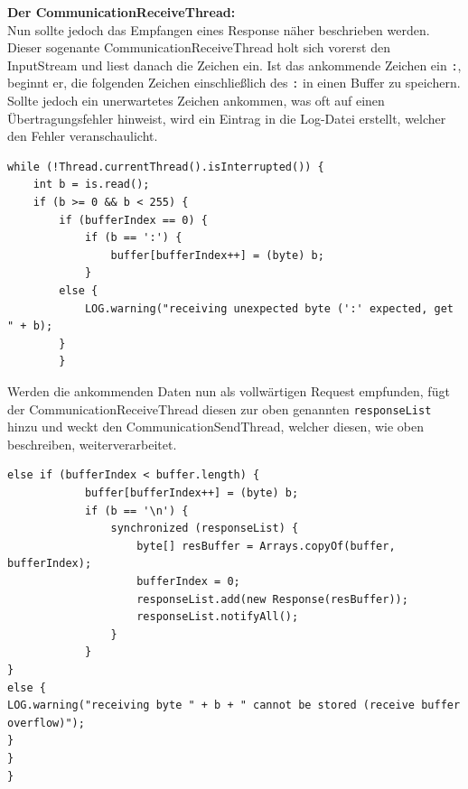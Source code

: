 \textbf{Der CommunicationReceiveThread:}\\
Nun sollte jedoch das Empfangen eines Response näher beschrieben werden.
Dieser sogenante CommunicationReceiveThread holt sich vorerst den InputStream und liest danach die Zeichen ein.
Ist das ankommende Zeichen ein \lstinline[style=java]{:}, beginnt er, die folgenden Zeichen einschließlich des \lstinline[style=java]{:} in einen Buffer zu speichern.
Sollte jedoch ein unerwartetes Zeichen ankommen, was oft auf einen Übertragungsfehler hinweist, wird ein Eintrag in die Log-Datei erstellt, welcher den Fehler veranschaulicht.
\begin{lstlisting}[style=java,caption=Java-Codebeispiel,label=commThreadSend]
while (!Thread.currentThread().isInterrupted()) {
    int b = is.read();
    if (b >= 0 && b < 255) {
        if (bufferIndex == 0) {
            if (b == ':') {
                buffer[bufferIndex++] = (byte) b;
            }
        else {
            LOG.warning("receiving unexpected byte (':' expected, get " + b);
        }
        }
\end{lstlisting}
Werden die ankommenden Daten nun als vollwärtigen Request empfunden, fügt der CommunicationReceiveThread diesen zur oben genannten \lstinline[style=java]{responseList} hinzu und weckt den CommunicationSendThread, welcher diesen, wie oben beschreiben, weiterverarbeitet.
\begin{lstlisting}[style=java,caption=Java-Codebeispiel,label=commThreadSend]
        else if (bufferIndex < buffer.length) {
            buffer[bufferIndex++] = (byte) b;
            if (b == '\n') {
                synchronized (responseList) {
                    byte[] resBuffer = Arrays.copyOf(buffer, bufferIndex);
                    bufferIndex = 0;
                    responseList.add(new Response(resBuffer));
                    responseList.notifyAll();
                }
            }
}
else {
LOG.warning("receiving byte " + b + " cannot be stored (receive buffer overflow)");
}
}
}
\end{lstlisting}
